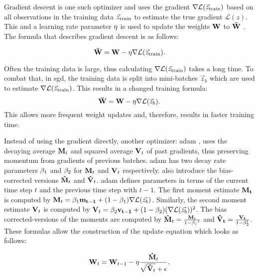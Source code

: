Gradient descent is one such optimizer and uses the gradient $\nabla \mathcal{L}(\vec{z}_{\mathrm{train}})$ based on all observations in the training data $\vec{z}_{\mathrm{train}}$ to estimate the true gradient $\mathcal{L}(z)$. This and a learning rate parameter $\mathit{\eta}$ is used to update the weights $\mathbf{W}$ to $\mathbf{\bar{W}}$ \cite{murphy2022probabilistic}. The formula that describes gradient descent is as follows:

\begin{equation} \mathbf{\bar{W}} = \mathbf{W} - \mathit{\eta} \nabla \mathcal{L}(\vec{z}_{\mathrm{train}}). \end{equation}

Often the training data is large, thus calculating $\nabla \mathcal{L}(\vec{z}_{\mathrm{train}})$ takes a long time. To combat that, in \ac{sgd}, the training data is split into mini-batches $\vec{z}_{b}$ which are used to estimate $\nabla \mathcal{L}(\vec{z}_{\mathrm{train}})$. This results in a changed training formula:
\begin{equation} \mathbf{\bar{W}} = \mathbf{W} - \mathit{\eta} \nabla \mathcal{L}(\vec{z}_{b}). \end{equation} This allows more frequent weight updates and, therefore, results in faster training time.


Instead of using the gradient directly, another optimizer: \ac{adam} \cite{kingma2017adam}, uses the decaying average $\mathbf{M}_t$ and squared average $\mathbf{V}_t$ of past gradients, thus preserving momentum from gradients of previous batches. \Ac{adam} has two decay rate parameters $\mathit{\beta}_1$ and $\mathit{\beta}_2$ for $\mathbf{M}_t$ and $\mathbf{V}_t$ respectively. \textcite{kingma2017adam} also introduce the bias-corrected versions $\mathbf{\hat{M}}_t$ and $\mathbf{\hat{V}}_t$. \Ac{adam} defines parameters in terms of the current time step $t$ and the previous time step with $t-1$. The first moment estimate $\mathbf{M_t}$ is computed by $\mathbf{M}_t = \mathit{\beta}_1 \mathbf{m_{t-1}} + (1 - \mathit{\beta}_1) \nabla \mathcal{L}(\vec{z_b})$. Similarly, the second moment estimate $\mathbf{V}_t$ is computed by $\mathbf{V}_t = \mathit{\beta}_2 \mathbf{v_{t-1}} + (1 - \mathit{\beta}_2) (\nabla \mathcal{L}(\vec{z_b}))^2$. 
The bias corrected-versions of the moments are computed by $\mathbf{\hat{M}}_t = \frac{\mathbf{M}_t}{1 - \mathit{\mathit{\beta}_1}^t}$ and $\mathbf{\hat{V}_t} = \frac{\mathbf{V_t}}{1 - \mathit{\beta}_2^t}$. These formulas allow the construction of the update equation which looks as follows:

\begin{equation}\mathbf{W}_t = \mathbf{W}_{t-1} - \mathit{\eta} \frac{\mathbf{\hat{M}}_t}{\sqrt{\mathbf{\hat{V}}_t} + \mathit{\epsilon}} \text{.} \end{equation}

